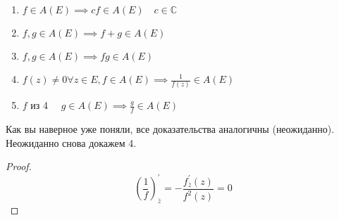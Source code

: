 \documentclass[main]{subfiles}
\begin{document}
\begin{enumerate}
    \item $f \in A(E) \implies cf \in A(E) \quad c \in \mathbb{C} $
    \item $f,g \in A(E) \implies f + g \in A(E) $
    \item $f,g \in A(E) \implies fg \in A(E) $
    \item $f(z) \ne 0 \forall z \in E, f \in A(E) \implies \frac{1}{f(z)} \in A(E) $
    \item $f$ из 4 $\quad g \in A(E) \implies \frac{g}{f} \in A(E) $
\end{enumerate}

Как вы наверное уже поняли, все доказательства аналогичны (неожиданно). Неожиданно снова докажем 4.
\begin{proof}
    \[ \left(\frac{1}{f}\right)^\prime_{\overline{z}} = - \frac{f^\prime_{\overline{z}}(z)}{f^2(z)} = 0 \]
\end{proof}
\end{document}

